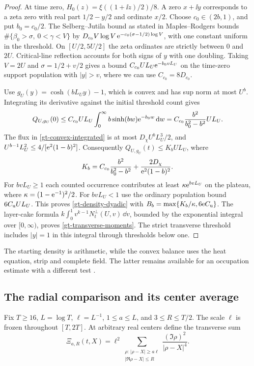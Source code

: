 \begin{proof}
At time zero, \(H_0(z)=\xi((1+\ii z)/2)/8\). A zero \(x+\ii y\)
corresponds to a zeta zero with real part \(1/2-y/2\) and
ordinate \(x/2\). Choose \(c_0\in(2b,1)\), and put
\(b_0=c_0/2\). The Selberg--Jutila bound as stated in Maples--Rodgers
\cite[Theorem~2.4 and \S4, (18), arXiv v2]{maplesrodgers}
bounds \(\#\{\beta_0>\sigma,\ 0<\gamma< V\}\) by
\(D_{c_0}V\log V\,\mathrm e^{-c_0(\sigma-1/2)\log V}\), with one constant
uniform in the threshold. On \([U/2,5U/2]\) the zeta ordinates
are strictly between \(0\) and \(2U\). Critical-line reflection
accounts for both signs of \(y\) with one doubling. Taking
\(V=2U\) and \(\sigma=1/2+v/2\) gives a bound
\(C_{c_0} U L_U\mathrm e^{-b_0vL_U}\) on the time-zero support population
with \(|y|>v\), where we can use \(C_{c_0}=8D_{c_0}\).

Use \(g_U(y)=\cosh(bL_Uy)-1\), which is convex and has sup norm
at most \(U^b\). Integrating its derivative against the initial
threshold count gives
\[
 Q_{U,g_U}(0)\le C_{c_0} U L_U
     \int_0^\infty b\sinh(bw)\mathrm e^{-b_0 w}\,\mathrm d w
 =C_{c_0}\frac{b^2}{b_0^2-b^2}U L_U.
\]
The flux in \eqref{gt-convex-integrated} is at most
\(D_\chi U^bL_U^3/2\), and
\(U^{b-1}L_U^2\le4/[\mathrm e^2(1-b)^2]\). Consequently
\(Q_{U,g_U}(t)\le K_b U L_U\), where
\[
 K_b=C_{c_0}\frac{b^2}{b_0^2-b^2}
            +\frac{2D_\chi}{\mathrm e^2(1-b)^2}.
\]
For \(bvL_U\ge1\) each counted occurrence contributes at least
\(\kappa\mathrm e^{bvL_U}\) on the plateau, where
\(\kappa=(1-\mathrm e^{-1})^2/2\). For \(bvL_U<1\) use the
ordinary population bound \(6C_{\rm u}UL_U\). This proves
\eqref{gt-density-dyadic} with
\(B_b=\max\{K_b/\kappa,6\mathrm e C_{\rm u}\}\). The layer-cake formula
\(k\int_0^1 v^{k-1}N_t^\perp(U,v)\,\dd v\), bounded by the exponential
integral over \([0,\infty)\), proves \eqref{gt-transverse-moments}.
The strict transverse threshold includes \(|y|=1\) in this integral
through thresholds below one.
\end{proof}

The starting density is arithmetic, while the convex balance uses the
heat equation, strip and complete field. The latter remains available
for an occupation estimate with a different test
\cite{tnddensity,gttransverse}.

\subsection{The radial comparison and its center average}

Fix \(T\ge16\), \(L=\log T\), \(\ell=L^{-1}\), \(1\le a\le L\),
and \(3\le R\le T/2\). The scale \(\ell\) is frozen throughout
\([T,2T]\). At arbitrary real centers define the transverse sum
\begin{equation}
 \Xi_{a,R}(t,X)=\ell^2\!
    \sum_{\substack{\rho:\,|\rho-X|\ge a\ell\\
                             |\Re\rho-X|\le R}}
    \frac{(\Im\rho)^2}{|\rho-X|^4}.
 \label{gt-transverse-xi}
\end{equation}

